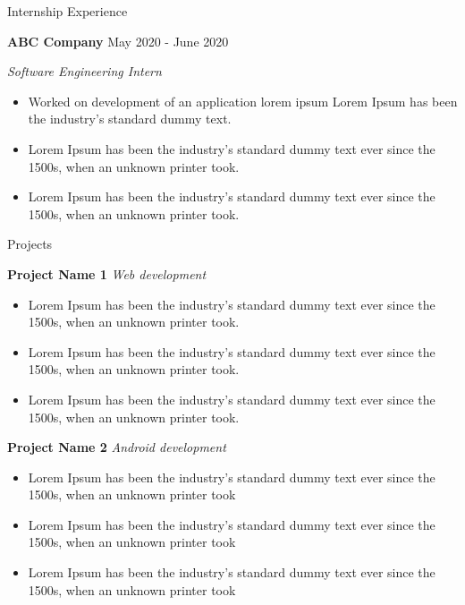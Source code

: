 \documentclass{article}
\newcommand{\sbt}{\,\begin{picture}(-1,1)(-1,-3)\circle*{2}\end{picture}\ }
\begin{document}
{{\bigskip
\Large {Internship Experience} \hrulefill \par
\smallskip
\normalsize { \bf {ABC Company} }\hspace*{\fill} {May 2020 - June 2020} \par 
\normalsize {\it Software Engineering Intern} \par
\vspace{-2mm}
\begin{itemize}[noitemsep]
  \item[\sbt] Worked on development of an application lorem ipsum Lorem Ipsum has been the industry's standard dummy text.
  \item[\sbt] Lorem Ipsum has been the industry's standard dummy text ever since the 1500s, when an unknown printer took.
  \item[\sbt] Lorem Ipsum has been the industry's standard dummy text ever since the 1500s, when an unknown printer took.
\end{itemize}




\medskip
\Large {Projects} \hrulefill \par

\medskip
\normalsize { \bf {Project Name 1} }\hspace*{\fill} {\it Web development} \par
\vspace{-2mm}
\begin{itemize}[noitemsep]
  \item[\sbt] Lorem Ipsum has been the industry's standard dummy text ever since the 1500s, when an unknown printer took.
  \item[\sbt] Lorem Ipsum has been the industry's standard dummy text ever since the 1500s, when an unknown printer took.
  \item[\sbt] Lorem Ipsum has been the industry's standard dummy text ever since the 1500s, when an unknown printer took.
\end{itemize}

\normalsize { \bf {Project Name 2} }\hspace*{\fill} {\it Android development} \par
\vspace{-2mm}
\begin{itemize}[noitemsep]
  \item[\sbt] Lorem Ipsum has been the industry's standard dummy text ever since the 1500s, when an unknown printer took
  \item[\sbt] Lorem Ipsum has been the industry's standard dummy text ever since the 1500s, when an unknown printer took
  \item[\sbt] Lorem Ipsum has been the industry's standard dummy text ever since the 1500s, when an unknown printer took
\end{itemize}




}}
\end{document}
